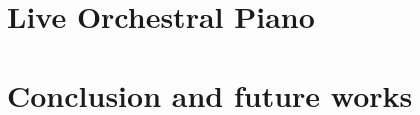 \documentclass[letterpaper]{article}
\begin{document}
%
%
%


\section{Live Orchestral Piano}


\section{Conclusion and future works}




\end{document}
